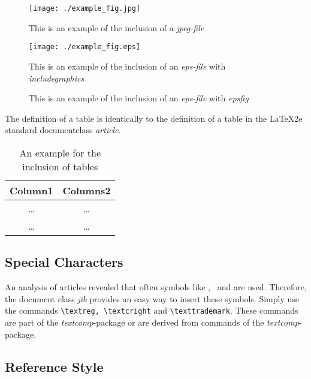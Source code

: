 \documentclass{jib}
\begin{document}
\begin{figure}[hp]
\centerline{\texttt{[image: ./example\_fig.jpg]}} \caption{This is an example of the
inclusion of a \emph{jpeg-file}} \label{fig:jpeg_ex}
\end{figure}

\begin{figure}[hp]
\centerline{\texttt{[image: ./example\_fig.eps]}} \caption{This is
an example of the inclusion of an \emph{eps-file} with
\emph{includegraphics}} \label{fig:eps_ex_var1}
\end{figure}

\begin{figure}[hp]
\centerline{}
\caption{This is an example of the inclusion of an \emph{eps-file}
with \emph{epsfig}} \label{fig:eps_ex_var2}
\end{figure}
\clearpage

The definition of a table is identically to the definition of a table in the \LaTeX2e standard documentclass \emph{article}.

\begin{table}[hp]
    \begin{center}
    \caption{An example for the inclusion of tables}
    \label{tab:table_ex}
        \begin{tabular}{|c|c|}
        \hline
        Column1 & Columns2\\
        \hline
        \hline
        \ldots & \ldots\\
        \ldots & \ldots\\
        \hline
        \end{tabular}
    \end{center}
\end{table}


\subsection{Special Characters}

An analysis of articles revealed that often symbols like \textreg, \textcright\
and \texttrademark are used. Therefore, the document class \emph{jib} provides
an easy way to insert these symbols. Simply use the commands
\lstinline|\textreg, \textcright| and \lstinline|\texttrademark|. These commands
are part of the \emph{textcomp}-package or are derived from commands of the
\emph{textcomp}-package.


\subsection{Reference Style}
\end{document}
